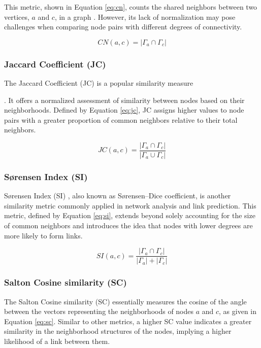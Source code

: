 This metric, shown in Equation \ref{eq:cn}, counts the shared neighbors between two vertices, $a$ and $c$, in a graph \cite{newman2001clustering}. However, its lack of normalization may pose challenges when comparing node pairs with different degrees of connectivity.

\begin{equation}
\label{eq:cn}
  CN(a, c) = |\Gamma_a \cap \Gamma_c|
\end{equation}


\subsubsection{Jaccard Coefficient (JC)}

The Jaccard Coefficient (JC) \cite{jaccard1901etude} is a popular similarity measure. It offers a normalized assessment of similarity between nodes based on their neighborhoods. Defined by Equation \ref{eq:jc}, JC assigns higher values to node pairs with a greater proportion of common neighbors relative to their total neighbors.

\begin{equation}
\label{eq:jc}
  JC(a, c) = \frac{|\Gamma_a \cap \Gamma_c|}{|\Gamma_a \cup \Gamma_c|}
\end{equation}


\subsubsection{S{\o}rensen Index (SI)}

S{\o}rensen Index (SI) \cite{sorensen1948method}, also known as S{\o}rensen–Dice coefficient, is another similarity metric commonly applied in network analysis and link prediction. This metric, defined by Equation \ref{eq:si}, extends beyond solely accounting for the size of common neighbors and introduces the idea that nodes with lower degrees are more likely to form links.

\begin{equation}
\label{eq:si}
  SI(a, c) = \frac{|\Gamma_a \cap \Gamma_c|}{|\Gamma_a| + |\Gamma_c|}
\end{equation}


\subsubsection{Salton Cosine similarity (SC)}

The Salton Cosine similarity (SC) \cite{salton1973specification} essentially measures the cosine of the angle between the vectors representing the neighborhoods of nodes $a$ and $c$, as given in Equation \ref{eq:sc}. Similar to other metrics, a higher SC value indicates a greater similarity in the neighborhood structures of the nodes, implying a higher likelihood of a link between them.

